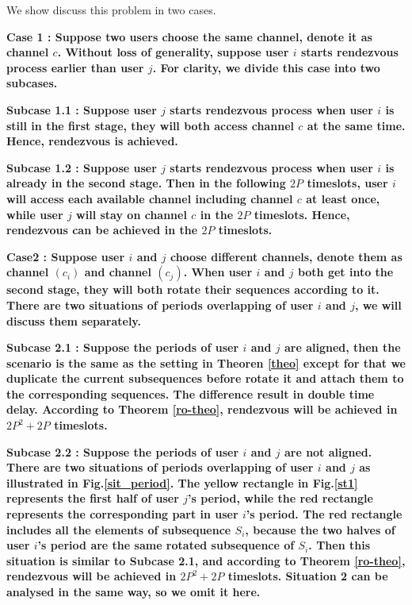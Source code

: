 \documentclass[10pt, conference, letterpaper]{IEEEtran}
\begin{document}
\begin{IEEEproof}
We show discuss this problem in two cases.

\bfseries Case 1 \mdseries: Suppose two users choose the same channel, denote it as channel $c$. Without loss of generality, suppose user $i$ starts rendezvous process earlier than user $j$. For clarity, we divide this case into two subcases.

\bfseries Subcase 1.1 \mdseries: Suppose user $j$ starts rendezvous process when user $i$ is still in the first stage, they will both access channel $c$ at the same time. Hence, rendezvous is achieved.

\bfseries Subcase 1.2 \mdseries: Suppose user $j$ starts rendezvous process when user $i$ is already in the second stage. Then in the following $2P$ timeslots, user $i$ will access each available channel including channel $c$ at least once, while user $j$ will stay on channel $c$ in the $2P$ timeslots. Hence, rendezvous can be achieved in the $2P$ timeslots.

\bfseries Case2 \mdseries: Suppose user $i$ and $j$ choose different channels, denote them as channel $(c_i)$ and channel $(c_j)$. When user $i$ and $j$ both get into the second stage, they will both rotate their sequences according to it. There are two situations of periods overlapping of user $i$ and $j$, we will discuss them separately.

\bfseries Subcase 2.1 \mdseries: Suppose the periods of user $i$ and $j$ are aligned, then the scenario is the same as the setting in Theoren \ref{theo} except for that we duplicate the current subsequences before rotate it and attach them to the corresponding sequences. The difference result in double time delay. According to Theorem \ref{ro-theo}, rendezvous will be achieved in $2P^2 + 2P$ timeslots.

\bfseries Subcase 2.2 \mdseries: Suppose the periods of user $i$ and $j$ are not aligned. There are two situations of periods overlapping of user $i$ and $j$ as illustrated in Fig.\ref{sit_period}. The yellow rectangle in Fig.\ref{st1} represents the first half of user $j$'s period, while the red rectangle represents the corresponding part in user $i$'s period. The red rectangle includes all the elements of subsequence $S_i$, because the two halves of user $i$'s period are the same rotated subsequence of $S_i$. Then this situation is similar to Subcase 2.1, and according to Theorem \ref{ro-theo}, rendezvous will be achieved in $2P^2 + 2P$ timeslots. Situation 2 can be analysed in the same way, so we omit it here.


\end{IEEEproof}
\end{document}
